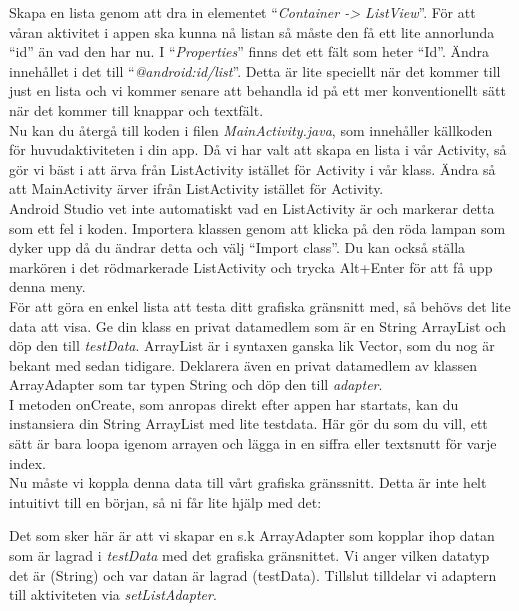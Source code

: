 \documentclass[11 pt, titlepage]{article} %
\begin{document}
Skapa en lista genom att dra in elementet “\textit{Container -> ListView}”.
För att våran aktivitet i appen ska kunna nå listan så måste den få ett lite annorlunda “id” än vad den har nu.
I “\textit{Properties}” finns det ett fält som heter “Id”.
Ändra innehållet i det till “\textit{@android:id/list}”.
Detta är lite speciellt när det kommer till just en lista och vi kommer senare att behandla id på ett mer konventionellt sätt när det kommer till knappar och textfält.\\

Nu kan du återgå till koden i filen \textit{MainActivity.java}, som innehåller källkoden för huvudaktiviteten i din app.
Då vi har valt att skapa en lista i vår Activity, så gör vi bäst i att ärva från ListActivity istället för Activity i vår klass.
Ändra så att MainActivity ärver ifrån ListActivity istället för Activity. \\

Android Studio vet inte automatiskt vad en ListActivity är och markerar detta som ett fel i koden.
Importera klassen genom att klicka på den röda lampan som dyker upp då du ändrar detta och välj “Import class”.
Du kan också ställa markören i det rödmarkerade ListActivity och trycka Alt+Enter för att få upp denna meny. \\ %

För att göra en enkel lista att testa ditt grafiska gränsnitt med, så behövs det lite data att visa.
Ge din klass en privat datamedlem som är en String ArrayList och döp den till \textit{testData}.
ArrayList är i syntaxen ganska lik Vector, som du nog är bekant med sedan tidigare.
Deklarera även en privat datamedlem av klassen ArrayAdapter som tar typen String och döp den till \textit{adapter}.\\

I metoden onCreate, som anropas direkt efter appen har startats, kan du instansiera din String ArrayList med lite testdata.
Här gör du som du vill, ett sätt är bara loopa igenom arrayen och lägga in en siffra eller textsnutt för varje index.\\

Nu måste vi koppla denna data till vårt grafiska gränssnitt. Detta är inte helt intuitivt till en början, så ni får lite hjälp med det:

Det som sker här är att vi skapar en s.k ArrayAdapter som kopplar ihop datan som är lagrad i \textit{testData} med det grafiska gränsnittet.
Vi anger vilken datatyp det är (String) och var datan är lagrad (testData).
Tillslut tilldelar vi adaptern till aktiviteten via \textit{setListAdapter}.\\
\end{document}
